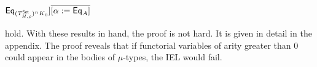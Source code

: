 \documentclass[runningheads]{llncs}
\newcommand{\set}{\mathsf{Set}}
\begin{document}
  \pagebreak

\noindent
$\Eq_{(T^\set_{H,\rho})^n K_0}] \overline{[\alpha := \Eq_A]}$
\begin{comment}
\[\begin{array}{ll}
&  \relsem{\Gamma; \Phi, \phi, \ol{\alpha} \vdash J} \Eq_{\rho} [\phi
  := T^{n}_{H,\Eq_{\rho}} K_0] \overline{[\alpha := \Eq_A]}\\
=  &
\relsem{\Gamma; \Phi, \phi,
  \ol{\alpha} \vdash J} \Eq_{\rho} [\phi := \Eq_{(T^\set_{H,\rho})^n K_0}]
\overline{[\alpha := \Eq_A]}
\end{array}\]
\end{comment}
hold. With these results in hand, the proof is not hard.  {\color{red}
  It is given in detail in the appendix.} The proof reveals that if
functorial variables of arity greater than $0$ could appear in the
bodies of $\mu$-types, the IEL would fail.
\end{document}
